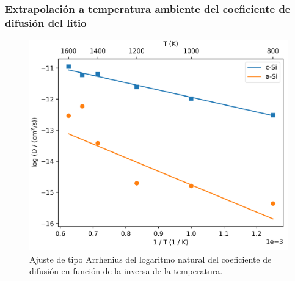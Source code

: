 \subsubsection{Extrapolación a temperatura ambiente del coeficiente de difusión del litio}

\begin{figure}[h!]
    \centering
    \includegraphics[width=.7\textwidth]{Silicio/comportamiento/resultados/traza/arrhenius/arrhenius.png}
    \caption{Ajuste de tipo Arrhenius del logaritmo natural del coeficiente de difusión
    en función de la inversa de la temperatura.}
    \label{fig:tarrhenius}
\end{figure}
